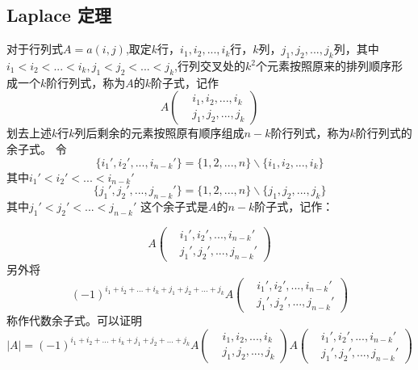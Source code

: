 \documentclass[blue,normal,cn]{elegantnote}
\begin{document}
\subsection{Laplace 定理}
\begin{theorem}
    对于行列式$A=a(i,j)$,取定$k$行，$i_1,i_2,...,i_k$行，$k$列，$j_1,j_2,...,j_k$列，其中$i_1<i_2<...<i_k,j_1<j_2<...<j_k$,行列交叉处的$k^2$个元素按照原来的排列顺序形成一个$k$阶行列式，称为$A$的$k$阶子式，记作
    \begin{equation*}
        A\left(
            \begin{aligned}
                &i_1,i_2,...,i_k\\
                &j_1,j_2,...,j_k
            \end{aligned}
        \right)
    \end{equation*}
    划去上述$k$行$k$列后剩余的元素按照原有顺序组成$n-k$阶行列式，称为$k$阶行列式的余子式。
    令
    $$\{i_1',i_2',...,i_{n-k}'\}=\{1,2,...,n\}\backslash \{i_1,i_2,...,i_k\}$$
    其中$i_1'<i_2'<...<i_{n-k}'$
    $$\{j_1',j_2',...,j_{n-k}'\}=\{1,2,...,n\}\backslash \{j_1,j_2,...,j_k\}$$
    其中$j_1'<j_2'<...<j_{n-k}'$
    这个余子式是$A$的$n-k$阶子式，记作：
    
    \begin{equation*}
        A\left(
            \begin{aligned}
                &i_1',i_2',...,i_{n-k}'\\
                &j_1',j_2',...,j_{n-k}'
            \end{aligned}
        \right)
    \end{equation*}
    另外将
    \begin{equation*}
        (-1)^{i_1+i_2+...+i_k+j_1+j_2+...+j_k}
        A\left(
            \begin{aligned}
                &i_1',i_2',...,i_{n-k}'\\
                &j_1',j_2',...,j_{n-k}'
            \end{aligned}
        \right)
    \end{equation*}
    称作代数余子式。可以证明
    \begin{equation*}
        |A|=(-1)^{i_1+i_2+...+i_k+j_1+j_2+...+j_k}
        A\left(
            \begin{aligned}
                &i_1,i_2,...,i_k\\
                &j_1,j_2,...,j_k
            \end{aligned}
        \right)
        A\left(
            \begin{aligned}
                &i_1',i_2',...,i_{n-k}'\\
                &j_1',j_2',...,j_{n-k}'
            \end{aligned}
        \right)
    \end{equation*}
\end{theorem}
\end{document}
